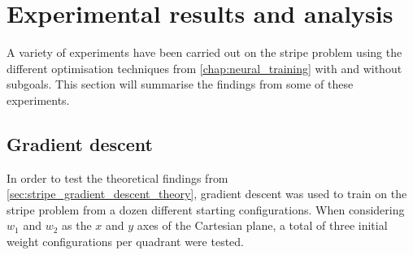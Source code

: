 \section{Experimental results and analysis}
A variety of experiments have been carried out on the stripe problem using the different optimisation techniques from \ref{chap:neural_training} with and without subgoals. 
This section will summarise the findings from some of these experiments. 

\subsection{Gradient descent}
\label{sec:stripe_gradient_descent}

In order to test the theoretical findings from \ref{sec:stripe_gradient_descent_theory}, gradient descent was used to train on the stripe problem from a dozen different starting configurations.
When considering $w_1$ and $w_2$ as the $x$ and $y$ axes of the Cartesian plane, a total of three initial weight configurations per quadrant were tested.


